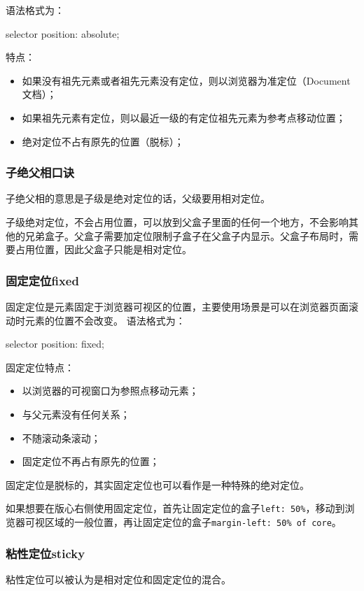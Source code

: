 语法格式为：
\begin{css}
    selector {
    position: absolute;
    }
\end{css}
特点：
\begin{itemize}
    \item 如果没有祖先元素或者祖先元素没有定位，则以浏览器为准定位（Document文档）；
    \item 如果祖先元素有定位，则以最近一级的有定位祖先元素为参考点移动位置；
    \item 绝对定位不占有原先的位置（脱标）；
\end{itemize}

\subsubsection{子绝父相口诀}

子绝父相的意思是子级是绝对定位的话，父级要用相对定位。

子级绝对定位，不会占用位置，可以放到父盒子里面的任何一个地方，不会影响其他的兄弟盒子。父盒子需要加定位限制子盒子在父盒子内显示。父盒子布局时，需要占用位置，因此父盒子只能是相对定位。

\subsubsection{固定定位fixed}
固定定位是元素固定于浏览器可视区的位置，主要使用场景是可以在浏览器页面滚动时元素的位置不会改变。
语法格式为：
\begin{css}
    selector {
    position: fixed;
    }
\end{css}

固定定位特点：
\begin{itemize}
    \item 以浏览器的可视窗口为参照点移动元素；
    \item 与父元素没有任何关系；
    \item 不随滚动条滚动；
    \item 固定定位不再占有原先的位置；
\end{itemize}

固定定位是脱标的，其实固定定位也可以看作是一种特殊的绝对定位。

如果想要在版心右侧使用固定定位，首先让固定定位的盒子\verb|left: 50%|，移动到浏览器可视区域的一般位置，再让固定定位的盒子\verb|margin-left: 50% of core|。

\subsubsection{粘性定位sticky}
粘性定位可以被认为是相对定位和固定定位的混合。

